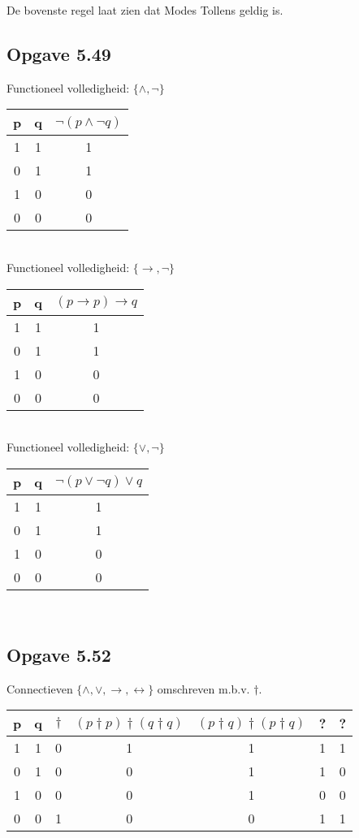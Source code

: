 \documentclass[11pt]{article}
\begin{document}
De bovenste regel laat zien dat Modes Tollens geldig is.

\subsection*{Opgave 5.49}

Functioneel volledigheid: $\{\wedge, \neg\}$

\begin{tabular}{cc|c}
p & q & $\neg (p \wedge \neg q)$ \\
\hline
1 & 1 & 1 \\
0 & 1 & 1 \\
1 & 0 & 0 \\
0 & 0 & 0 \\
\end{tabular}
\\

Functioneel volledigheid: $\{\rightarrow, \neg\}$

\begin{tabular}{cc|c}
p & q & $(p \rightarrow p) \rightarrow q$ \\
\hline
1 & 1 & 1 \\
0 & 1 & 1 \\
1 & 0 & 0 \\
0 & 0 & 0 \\
\end{tabular}
\\

Functioneel volledigheid: $\{\vee, \neg\}$

\begin{tabular}{cc|c}
p & q & $\neg (p \vee \neg q) \vee q$ \\
\hline
1 & 1 & 1 \\
0 & 1 & 1 \\
1 & 0 & 0 \\
0 & 0 & 0 \\
\end{tabular}
\\

\subsection*{Opgave 5.52}

Connectieven $\{\wedge, \vee, \rightarrow, \leftrightarrow\}$ omschreven m.b.v.
$\dagger$. \\

\begin{tabular}{ccc|c|c|c|c}
p & q & $\dagger$
  & $(p \dagger p) \dagger (q \dagger q)$
  & $(p \dagger q) \dagger (p \dagger q)$
  & ?
  & ? \\
\hline
1 & 1 & 0  & 1 & 1  & 1 & 1 \\
0 & 1 & 0  & 0 & 1  & 1 & 0 \\
1 & 0 & 0  & 0 & 1  & 0 & 0 \\
0 & 0 & 1  & 0 & 0  & 1 & 1 \\
\end{tabular}
\\
\end{document}
